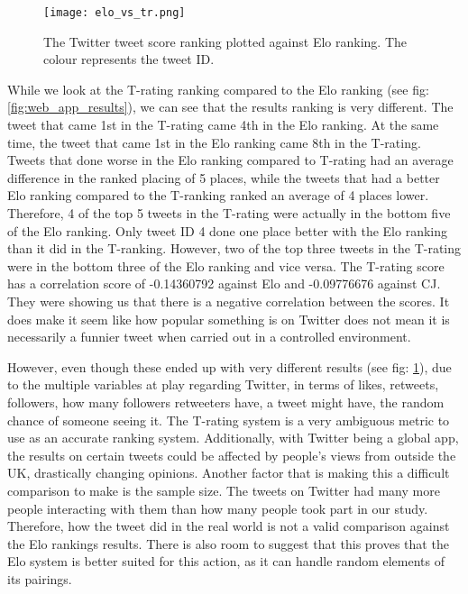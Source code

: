 		

	\begin{figure}[t]
		\centering
		\texttt{[image: elo\_vs\_tr.png]}
		\caption{The Twitter tweet score ranking plotted against Elo ranking. The colour represents the tweet ID.}
		\label{fig:elo_vs_tranking}
		
	\end{figure}

	While we look at the T-rating ranking compared to the Elo ranking (see fig: \ref{fig:web_app_results}), we can see that the results ranking is very different. The tweet that came 1st in the T-rating came 4th in the Elo ranking. At the same time, the tweet that came 1st in the Elo ranking came 8th in the T-rating.  Tweets that done worse in the Elo ranking compared to T-rating had an average difference in the ranked placing of 5 places, while the tweets that had a better Elo ranking compared to the T-ranking ranked an average of 4 places lower. Therefore, 4 of the top 5 tweets in the T-rating were actually in the bottom five of the Elo ranking. Only tweet ID 4 done one place better with the Elo ranking than it did in the T-ranking. However, two of the top three tweets in the T-rating were in the bottom three of the Elo ranking and vice versa. The T-rating score has a correlation score of -0.14360792 against Elo and -0.09776676 against CJ. They were showing us that there is a negative correlation between the scores. It does make it seem like how popular something is on Twitter does not mean it is necessarily a funnier tweet when carried out in a controlled environment.
	
	However, even though these ended up with very different results (see fig: \ref{fig:elo_vs_tranking}), due to the multiple variables at play regarding Twitter, in terms of likes, retweets, followers, how many followers retweeters have, a tweet might have, the random chance of someone seeing it. The T-rating system is a very ambiguous metric to use as an accurate ranking system. Additionally, with Twitter being a global app, the results on certain tweets could be affected by people's views from outside the UK, drastically changing opinions. Another factor that is making this a difficult comparison to make is the sample size. The tweets on Twitter had many more people interacting with them than how many people took part in our study. Therefore, how the tweet did in the real world is not a valid comparison against the Elo rankings results. There is also room to suggest that this proves that the Elo system is better suited for this action, as it can handle random elements of its pairings. 
	
